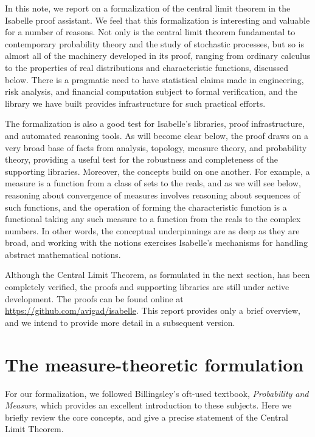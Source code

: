 \documentclass{article}
\begin{document}
In this note, we report on a formalization of the central limit theorem in the Isabelle proof assistant. We feel that this formalization is interesting and valuable for a number of reasons. Not only is the central limit theorem fundamental to contemporary probability theory and the study of stochastic processes, but so is almost all of the machinery developed in its proof, ranging from ordinary calculus to the properties of real distributions and characteristic functions, discussed below. There is a pragmatic need to have statistical claims made in engineering, risk analysis, and financial computation subject to formal verification, and the library we have built provides infrastructure for such practical efforts.

The formalization is also a good test for Isabelle's libraries, proof infrastructure, and automated reasoning tools. As will become clear below, the proof draws on a very broad base of facts from analysis, topology, measure theory, and probability theory, providing a useful test for the robustness and completeness of the supporting libraries. 
Moreover, the concepts build on one another. For example, a measure is a function from a class of sets to the reals, and as we will see below, reasoning about convergence of measures involves reasoning about sequences of such functions, and the operation of forming the characteristic function is a functional taking any such measure to a function from the reals to the complex numbers. In other words, the conceptual underpinnings are as deep as they are broad, and working with the notions exercises Isabelle's mechanisms for handling abstract mathematical notions.

Although the Central Limit Theorem, as formulated in the next section, has been completely verified, the proofs and supporting libraries are still under active development. The proofs can be found online at \url{https://github.com/avigad/isabelle}. This report provides only a brief overview, and we intend to provide more detail in a subsequent version.


\section{The measure-theoretic formulation}

For our formalization, we followed Billingsley's oft-used textbook, \emph{Probability and Measure}, which provides an excellent introduction to these subjects. Here we briefly review the core concepts, and give a precise statement of the Central Limit Theorem.
\end{document}
